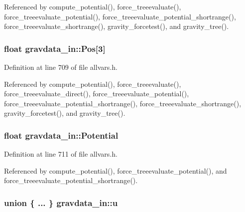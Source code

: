 Referenced by compute\_\-potential(), force\_\-treeevaluate(), force\_\-treeevaluate\_\-potential(), force\_\-treeevaluate\_\-potential\_\-shortrange(), force\_\-treeevaluate\_\-shortrange(), gravity\_\-forcetest(), and gravity\_\-tree().

\hypertarget{structgravdata__in_a8cac0f094027f8638152ecdcf11f1e92}{
\subsubsection[{Pos}]{\setlength{\rightskip}{0pt plus 5cm}float {\bf gravdata\_\-in::Pos}\mbox{[}3\mbox{]}}}
\label{structgravdata__in_a8cac0f094027f8638152ecdcf11f1e92}


Definition at line 709 of file allvars.h.



Referenced by compute\_\-potential(), force\_\-treeevaluate(), force\_\-treeevaluate\_\-direct(), force\_\-treeevaluate\_\-potential(), force\_\-treeevaluate\_\-potential\_\-shortrange(), force\_\-treeevaluate\_\-shortrange(), gravity\_\-forcetest(), and gravity\_\-tree().

\hypertarget{structgravdata__in_ac003758a6c6e72bb9cc1ce619fabf148}{
\subsubsection[{Potential}]{\setlength{\rightskip}{0pt plus 5cm}float {\bf gravdata\_\-in::Potential}}}
\label{structgravdata__in_ac003758a6c6e72bb9cc1ce619fabf148}


Definition at line 711 of file allvars.h.



Referenced by compute\_\-potential(), force\_\-treeevaluate\_\-potential(), and force\_\-treeevaluate\_\-potential\_\-shortrange().

\hypertarget{structgravdata__in_a89df6fdf4fb1512fa2b491eb4fb10662}{
\subsubsection[{u}]{\setlength{\rightskip}{0pt plus 5cm}union \{ ... \} 
   {\bf gravdata\_\-in::u}}}
\label{structgravdata__in_a89df6fdf4fb1512fa2b491eb4fb10662}


